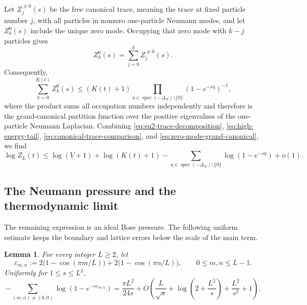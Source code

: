 \documentclass[11pt]{article}
\numberwithin{equation}{section}
\newtheorem{lemma}[theorem]{Lemma}
\theoremstyle{remark}
\newcommand{\1}{\mathbf 1}
\newcommand{\spec}{\operatorname{spec}}
\begin{document}
Let \(Z_j^{\ne0}(s)\) be the free canonical trace, meaning the trace at
fixed particle number \(j\), with all particles in nonzero one-particle
Neumann modes, and let \(Z_k^0(s)\) include the unique zero mode.
Occupying that zero mode with \(k-j\) particles gives
\[
 Z_k^0(s)=\sum_{j=0}^k Z_j^{\ne0}(s).
\]
Consequently,
\begin{equation}
 \sum_{k=0}^{K(t)} Z_k^0(s)
 \leq(K(t)+1)
 \prod_{\eta\in\spec(-\Delta_N)\setminus\{0\}}
 (1-e^{-s\eta})^{-1},
 \label{eq:zero-mode-grand-canonical}
\end{equation}
where the product sums all occupation numbers independently and therefore
is the grand-canonical partition function over the positive eigenvalues of
the one-particle Neumann Laplacian.  Combining
\eqref{eq:su2-trace-decomposition}, \eqref{eq:high-energy-tail},
\eqref{eq:canonical-trace-comparison}, and
\eqref{eq:zero-mode-grand-canonical}, we find
\begin{equation}
 \log Z_L(t)\leq\log(V+1)+\log(K(t)+1)
 -\sum_{\eta\in\spec(-\Delta_N)\setminus\{0\}}
 \log(1-e^{-s\eta})+o(1).
 \label{eq:box-pressure-before-heat}
\end{equation}

\subsection{The Neumann pressure and the thermodynamic limit}
\label{subsec:neumann-pressure}

The remaining expression is an ideal Bose pressure.  The following
uniform estimate keeps the boundary and lattice errors below the scale of
the main term.

\begin{lemma}
\label{lem:neumann-heat-trace}
For every integer \(L\geq2\), let
\[
 \varepsilon_{m,n}:=
 2\bigl(1-\cos(\pi m/L)\bigr)
 +2\bigl(1-\cos(\pi n/L)\bigr),
 \qquad 0\leq m,n\leq L-1.
\]
Uniformly for \(1\leq s\leq L^2\),
\begin{equation}
 -\sum_{(m,n)\ne(0,0)}\log(1-e^{-s\varepsilon_{m,n}})
 =\frac{\pi L^2}{24s}
 +O\!\left(
 \frac{L}{\sqrt s}
 +\log\!\left(2+\frac{L^2}{s}\right)
 +\frac{L^2}{s^2}+1\right).
 \label{eq:neumann-heat-trace}
\end{equation}
\end{lemma}
\end{document}
